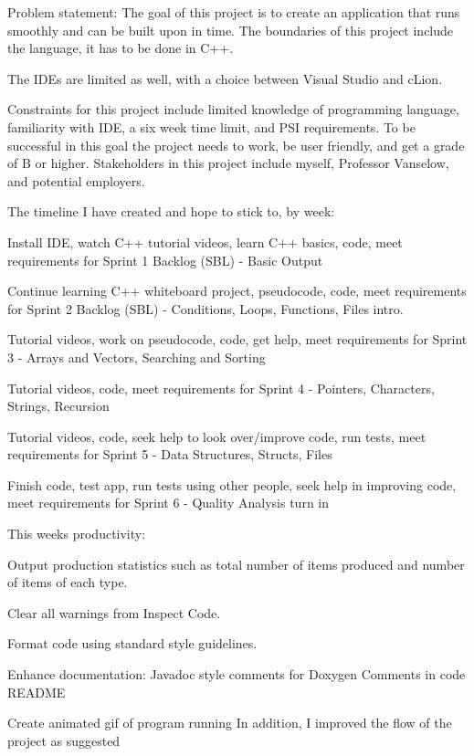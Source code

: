 Problem statement\+: The goal of this project is to create an application that runs smoothly and can be built upon in time. The boundaries of this project include the language, it has to be done in C++.

The I\+D\+Es are limited as well, with a choice between Visual Studio and c\+Lion.

Constraints for this project include limited knowledge of programming language, familiarity with I\+DE, a six week time limit, and P\+SI requirements. To be successful in this goal the project needs to work, be user friendly, and get a grade of B or higher. Stakeholders in this project include myself, Professor Vanselow, and potential employers.

The timeline I have created and hope to stick to, by week\+:


\begin{DoxyEnumerate}
\item Install I\+DE, watch C++ tutorial videos, learn C++ basics, code, meet requirements for Sprint 1 Backlog (S\+BL) -\/ Basic Output
\item Continue learning C++ whiteboard project, pseudocode, code, meet requirements for Sprint 2 Backlog (S\+BL) -\/ Conditions, Loops, Functions, Files intro.
\item Tutorial videos, work on pseudocode, code, get help, meet requirements for Sprint 3 -\/ Arrays and Vectors, Searching and Sorting
\item Tutorial videos, code, meet requirements for Sprint 4 -\/ Pointers, Characters, Strings, Recursion
\item Tutorial videos, code, seek help to look over/improve code, run tests, meet requirements for Sprint 5 -\/ Data Structures, Structs, Files
\item Finish code, test app, run tests using other people, seek help in improving code, meet requirements for Sprint 6 -\/ Quality Analysis turn in
\end{DoxyEnumerate}

This weeks productivity\+:
\begin{DoxyEnumerate}
\item Output production statistics such as total number of items produced and number of items of each type.
\item Clear all warnings from Inspect Code.
\item Format code using standard style guidelines.
\item Enhance documentation\+: Javadoc style comments for Doxygen Comments in code R\+E\+A\+D\+ME
\item Create animated gif of program running In addition, I improved the flow of the project as suggested
\end{DoxyEnumerate}


